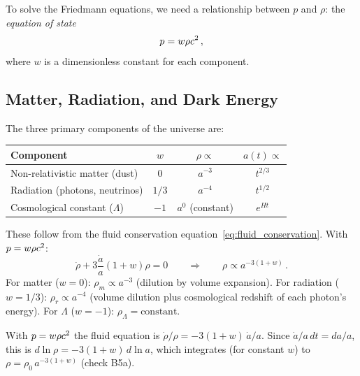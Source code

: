 To solve the Friedmann equations, we need a relationship between $p$ and
$\rho$: the \emph{equation of state}
\begin{equation}
    p = w\rho c^2 \,,
    \label{eq:eos}
\end{equation}
where $w$ is a dimensionless constant for each component.

\subsection{Matter, Radiation, and Dark Energy}

The three primary components of the universe are:
\begin{center}
\begin{tabular}{lccc}
\toprule
\textbf{Component} & $w$ & $\rho \propto$ & $a(t) \propto$ \\
\midrule
Non-relativistic matter (dust) & $0$ & $a^{-3}$ & $t^{2/3}$ \\
Radiation (photons, neutrinos) & $1/3$ & $a^{-4}$ & $t^{1/2}$ \\
Cosmological constant ($\Lambda$) & $-1$ & $a^0$ (constant) & $e^{Ht}$ \\
\bottomrule
\end{tabular}
\end{center}

These follow from the fluid conservation
equation~\eqref{eq:fluid_conservation}.  With $p = w\rho c^2$:
\begin{equation}
    \dot{\rho} + 3\frac{\dot{a}}{a}(1 + w)\rho = 0
    \qquad \Longrightarrow \qquad
    \rho \propto a^{-3(1+w)} \,.
    \label{eq:rho_scaling}
\end{equation}
For matter ($w = 0$): $\rho_m \propto a^{-3}$ (dilution by volume
expansion).  For radiation ($w = 1/3$): $\rho_r \propto a^{-4}$ (volume
dilution plus cosmological redshift of each photon's energy).  For
$\Lambda$ ($w = -1$): $\rho_\Lambda = \text{constant}$.


\begin{derivation}
With $p = w\rho c^2$ the fluid equation is
$\dot\rho/\rho = -3(1+w)\,\dot a/a$.  Since $\dot a/a\,dt = da/a$, this is
$d\ln\rho = -3(1+w)\,d\ln a$, which integrates (for constant $w$) to
$\rho = \rho_0\,a^{-3(1+w)}$ (check B5a).
\end{derivation}

